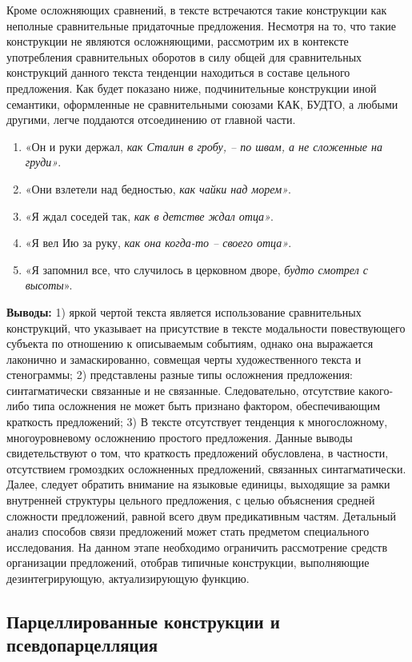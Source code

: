 \documentclass{kursa4}
\begin{document}
{      Кроме осложняющих сравнений, в тексте встречаются такие конструкции  как неполные сравнительные придаточные предложения. Несмотря на то, что такие конструкции не являются осложняющими, рассмотрим их в контексте употребления сравнительных оборотов в силу общей для сравнительных конструкций данного текста тенденции находиться в составе цельного предложения. Как будет показано ниже, подчинительные конструкции иной семантики, оформленные не сравнительными союзами КАК, БУДТО, а любыми другими, легче поддаются отсоединению от главной части. 
       \begin{enumerate}
          \item «Он и руки держал, \textit{как Сталин в гробу, – по швам, а не сложенные на груди»}. \item «Они взлетели над бедностью, \textit{как чайки над морем»}. \item «Я ждал соседей так, \textit{как в детстве ждал отца»}. \item «Я вел Ию за руку, \textit{как она когда-то – своего отца»}. \item «Я запомнил все, что случилось в церковном дворе, \textit{будто смотрел с высоты}». \end{enumerate}

      \textbf{Выводы:} 1) яркой чертой текста является использование сравнительных конструкций, что указывает на присутствие в тексте модальности повествующего субъекта по отношению к описываемым событиям, однако она выражается лаконично и замаскированно, совмещая черты художественного текста и стенограммы; 2) представлены разные типы осложнения предложения: синтагматически связанные и не связанные. Следовательно, отсутствие какого-либо типа осложнения не может быть признано фактором, обеспечивающим краткость предложений; 3) В тексте отсутствует тенденция к многосложному, многоуровневому осложнению простого предложения. Данные выводы свидетельствуют о том, что краткость предложений обусловлена, в частности, отсутствием громоздких осложненных предложений, связанных синтагматически. Далее, следует обратить внимание на языковые единицы, выходящие за рамки внутренней структуры цельного предложения, с целью объяснения средней сложности предложений, равной всего двум предикативным частям.   Детальный анализ способов связи предложений может стать предметом специального исследования. На данном этапе необходимо ограничить рассмотрение средств организации предложений, отобрав типичные конструкции, выполняющие дезинтегрирующую, актуализирующую функцию. \subsection{Парцеллированные конструкции и псевдопарцелляция}

}
\end{document}
